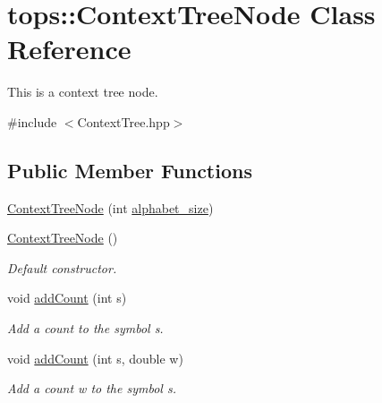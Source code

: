 \hypertarget{classtops_1_1ContextTreeNode}{}\section{tops\+:\+:Context\+Tree\+Node Class Reference}
\label{classtops_1_1ContextTreeNode}


This is a context tree node.  




{\ttfamily \#include $<$Context\+Tree.\+hpp$>$}

\subsection*{Public Member Functions}
\begin{DoxyCompactItemize}
\item 
\hyperlink{classtops_1_1ContextTreeNode_aef430feff82a67af06846a485d544a72}{Context\+Tree\+Node} (int \hyperlink{classtops_1_1ContextTreeNode_ad0596678234c3ae9ebcd61a18f7cc744}{alphabet\+\_\+size})
\item 
\mbox{\label{classtops_1_1ContextTreeNode_a58494674e7793cae886a62533003309c}} 
\hyperlink{classtops_1_1ContextTreeNode_a58494674e7793cae886a62533003309c}{Context\+Tree\+Node} ()
\begin{DoxyCompactList}\small\item\em Default constructor. \end{DoxyCompactList}\item 
\mbox{\label{classtops_1_1ContextTreeNode_a0137c15b9e5c3ee0769fefb215d3f995}} 
void \hyperlink{classtops_1_1ContextTreeNode_a0137c15b9e5c3ee0769fefb215d3f995}{add\+Count} (int s)
\begin{DoxyCompactList}\small\item\em Add a count to the symbol s. \end{DoxyCompactList}\item 
\mbox{\label{classtops_1_1ContextTreeNode_af01e5ee6dd48e5a61f770692591979a5}} 
void \hyperlink{classtops_1_1ContextTreeNode_af01e5ee6dd48e5a61f770692591979a5}{add\+Count} (int s, double w)
\begin{DoxyCompactList}\small\item\em Add a count w to the symbol s. \end{DoxyCompactList}\item 

\end{DoxyCompactItemize}
